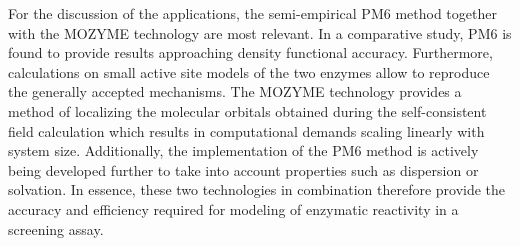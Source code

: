 For the discussion of the applications, the semi-empirical PM6 method\cite{stewart2007optimization, stewart2009application} together with the MOZYME technology\cite{stewart1996application} are most relevant.
In a comparative study, PM6 is found to provide results approaching density functional accuracy\cite{schenker2011assessment}.
Furthermore, calculations on small active site models of the two enzymes allow to reproduce the generally accepted mechanisms.
The MOZYME technology provides a method of localizing the molecular orbitals obtained during the self-consistent field calculation which results in computational demands scaling linearly with system size.
Additionally, the implementation of the PM6 method is actively being developed further to take into account properties such as dispersion or solvation\cite{rezac2009semiempirical, vrezavc2011halogen}.
In essence, these two technologies in combination therefore provide the accuracy and efficiency required for modeling of enzymatic reactivity in a screening assay.

